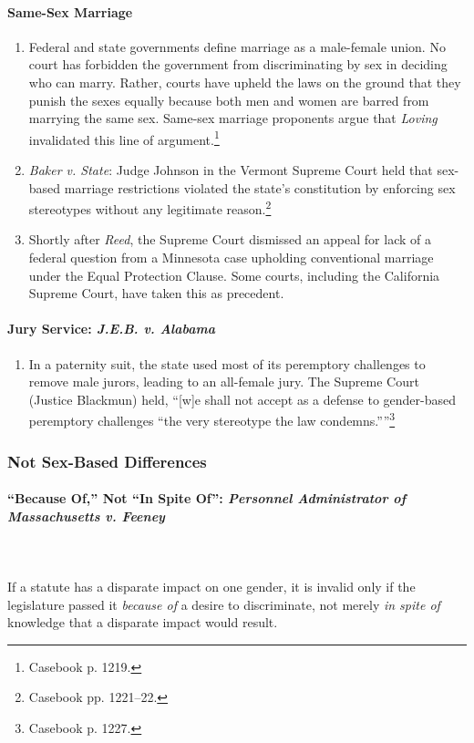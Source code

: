 \paragraph{Same-Sex Marriage}

\begin{enumerate}
    \item Federal and state governments define marriage as a male-female 
    union. No court has forbidden the government from discriminating by sex in 
    deciding who can marry. Rather, courts have upheld the laws on the ground 
    that they punish the sexes equally because both men and women are barred 
    from marrying the same sex. Same-sex marriage proponents argue that 
    \emph{Loving} invalidated this line of argument.\footnote{Casebook p. 
    1219.}
    \item \emph{Baker v. State}: Judge Johnson in the Vermont Supreme Court 
    held that sex-based marriage restrictions violated the state's 
    constitution by enforcing sex stereotypes without any legitimate 
    reason.\footnote{Casebook pp. 1221--22.}
    \item Shortly after \emph{Reed}, the Supreme Court dismissed an appeal for 
    lack of a federal question from a Minnesota case upholding conventional 
    marriage under the Equal Protection Clause. Some courts, including the 
    California Supreme Court, have taken this as precedent.
\end{enumerate}
 
\paragraph{Jury Service: \emph{J.E.B. v. Alabama}}

\begin{enumerate}
    \item In a paternity suit, the state used most of its peremptory 
    challenges to remove male jurors, leading to an all-female jury. The 
    Supreme Court (Justice Blackmun) held, ``[w]e shall not accept as a 
    defense to gender-based peremptory challenges \enquote{the very stereotype 
    the law condemns.}''\footnote{Casebook p. 1227.}
\end{enumerate}

\subsubsection{Not Sex-Based Differences}

\paragraph{``Because Of,'' Not ``In Spite Of'': \emph{Personnel Administrator 
of Massachusetts v. Feeney}}
~\\\\
If a statute has a disparate impact on one gender, it is invalid only if 
the legislature passed it \emph{because of} a desire to discriminate, not 
merely \emph{in spite of} knowledge that a disparate impact would result.

